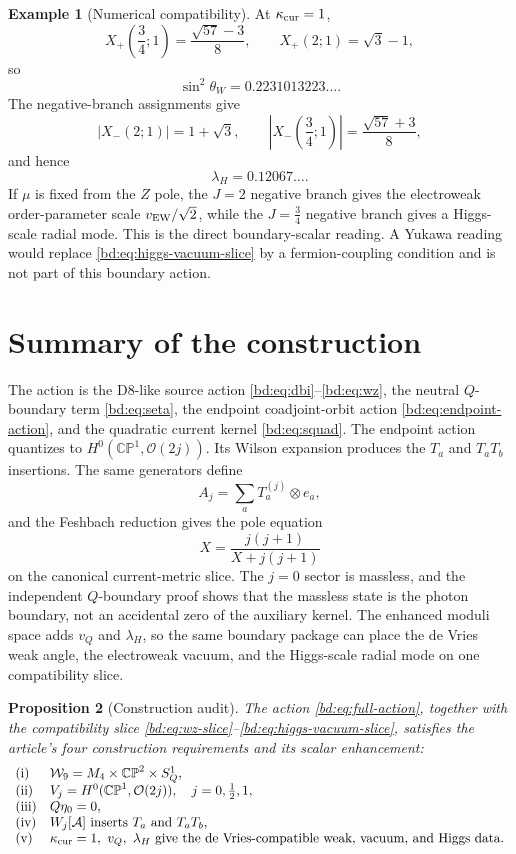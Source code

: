 \documentclass[11pt]{article}
\newcommand{\CP}{\mathbb{CP}}
\newcommand{\WW}{\mathcal{W}}
\newcommand{\OO}{\mathcal{O}}
\theoremstyle{plain}
\newtheorem{proposition}{Proposition}[section]
\theoremstyle{definition}
\newtheorem{example}[proposition]{Example}
\begin{document}
\begin{example}[Numerical compatibility]
\label{bd:ex:numerical-compatibility}
At \(\kappa_{\rm cur}=1\),
\[
  X_+\!\left(\frac34;1\right)=\frac{\sqrt{57}-3}{8},
  \qquad
  X_+(2;1)=\sqrt3-1,
\]
so
\[
  \sin^2\theta_W=0.2231013223\ldots .
\]
The negative-branch assignments give
\[
  |X_-(2;1)|=1+\sqrt3,\qquad
  \left|X_-\!\left(\frac34;1\right)\right|
  =\frac{\sqrt{57}+3}{8},
\]
and hence
\[
  \lambda_H=0.12067\ldots .
\]
If \(\mu\) is fixed from the \(Z\) pole, the \(J=2\) negative branch gives the
electroweak order-parameter scale \(v_{\rm EW}/\sqrt2\), while the
\(J=\tfrac34\) negative branch gives a Higgs-scale radial mode.  This is the
direct boundary-scalar reading.  A Yukawa reading would replace
\eqref{bd:eq:higgs-vacuum-slice} by a fermion-coupling condition and is not part
of this boundary action.
\end{example}

\section{Summary of the construction}
\label{bd:sec:summary}

The action is the D8-like source action \eqref{bd:eq:dbi}--\eqref{bd:eq:wz}, the
neutral \(Q\)-boundary term \eqref{bd:eq:seta}, the endpoint coadjoint-orbit action
\eqref{bd:eq:endpoint-action}, and the quadratic current kernel \eqref{bd:eq:squad}.
The endpoint action quantizes to \(H^0(\CP^1,\OO(2j))\).  Its Wilson expansion
produces the \(T_a\) and \(T_aT_b\) insertions.  The same generators define
\[
  A_j=\sum_aT_a^{(j)}\otimes e_a,
\]
and the Feshbach reduction gives the pole equation
\[
  X=\frac{j(j+1)}{X+j(j+1)}
\]
on the canonical current-metric slice.  The \(j=0\) sector is massless, and the
independent \(Q\)-boundary proof shows that the massless state is the photon
boundary, not an accidental zero of the auxiliary kernel.  The enhanced moduli
space adds \(v_Q\) and \(\lambda_H\), so the same boundary package can place the
de Vries weak angle, the electroweak vacuum, and the Higgs-scale radial mode on
one compatibility slice.

\begin{proposition}[Construction audit]
\label{bd:prop:construction-audit}
The action \eqref{bd:eq:full-action}, together with the compatibility slice
\eqref{bd:eq:wz-slice}--\eqref{bd:eq:higgs-vacuum-slice}, satisfies the article's
four construction requirements and its scalar enhancement:
\[
\begin{array}{ll}
{\rm (i)} & \WW_9=M_4\times\CP^2\times S^1_Q,\\
{\rm (ii)} & V_j=H^0(\CP^1,\OO(2j)),\quad j=0,\frac12,1,\\
{\rm (iii)} & Q\eta_0=0,\\
{\rm (iv)} & W_j[\mathcal A]\hbox{ inserts }T_a\hbox{ and }T_aT_b,\\
{\rm (v)} & \kappa_{\rm cur}=1,\ v_Q,\ \lambda_H
  \hbox{ give the de Vries-compatible weak, vacuum, and Higgs data.}
\end{array}
\]
\end{proposition}
\end{document}
